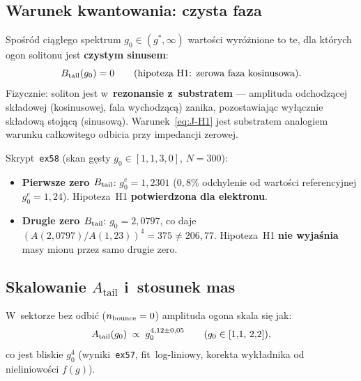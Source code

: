 \subsection{Warunek kwantowania: czysta faza}\label{app:J-kwant}

\begin{proposition}\label{prop:J-quantization}
Spośród ciągłego spektrum $g_0 \in (g^*, \infty)$ wartości wyróżnione
to te, dla których ogon solitonu jest \textbf{czystym sinusem}:
\begin{equation}\label{eq:J-H1}
  B_{\rm tail}(g_0) = 0
  \qquad (\text{hipoteza H1: zerowa faza kosinusowa}).
\end{equation}
Fizycznie: soliton jest w~\textbf{rezonansie z~substratem} ---
amplituda odchodzącej składowej (kosinusowej, fala wychodzącą)
zanika, pozostawiając wyłącznie składową stojącą (sinusową).
Warunek~\eqref{eq:J-H1} jest substratem analogiem warunku
całkowitego odbicia przy impedancji zerowej.
\end{proposition}

\begin{remark}\label{rem:J-verif}
Skrypt~\texttt{ex58} (skan gęsty $g_0 \in [1{,}1, 3{,}0]$, $N = 300$):
\begin{itemize}[nosep]
  \item \textbf{Pierwsze zero $B_{\rm tail}$}: $g_0^e = 1{,}2301$
    ($0{,}8\%$ odchylenie od wartości referencyjnej $g_0^e = 1{,}24$).
    Hipoteza~H1 \textbf{potwierdzona dla elektronu}.
  \item \textbf{Drugie zero $B_{\rm tail}$}: $g_0 = 2{,}0797$,
    co daje $(A(2{,}0797)/A(1{,}23))^4 = 375 \neq 206{,}77$.
    Hipoteza~H1 \textbf{nie wyjaśnia} masy mionu przez samo drugie zero.
\end{itemize}
\end{remark}

\subsection{Skalowanie $A_\mathrm{tail}$ i~stosunek mas}\label{app:J-skalowanie}

\begin{proposition}\label{prop:J-scaling}
W~sektorze bez odbić ($n_{\rm bounce} = 0$) amplituda ogona skala się jak:
\begin{equation}\label{eq:J-scaling}
  A_{\rm tail}(g_0) \;\propto\; g_0^{4{,}12 \pm 0{,}05}
  \qquad (g_0 \in [1{,}1,\, 2{,}2]),
\end{equation}
co jest bliskie $g_0^4$ (wyniki~\texttt{ex57}, fit~log-liniowy,
korekta wykładnika od nieliniowości $f(g)$).
\end{proposition}

